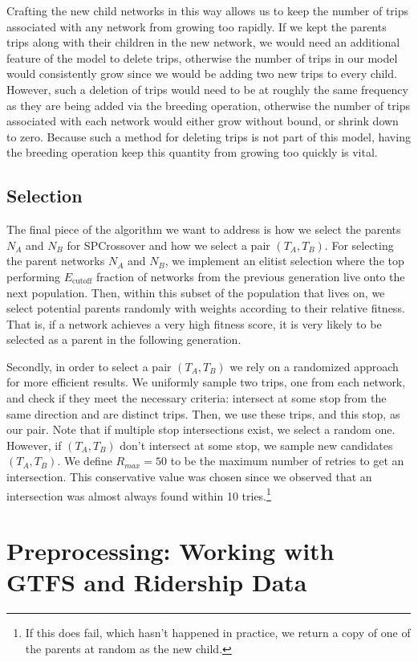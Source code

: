 \documentclass[11pt]{amsart}
\theoremstyle{definition}                  %
\theoremstyle{remark}                       %
\numberwithin{equation}{section}
\begin{document}
Crafting the new child networks in this way allows us to keep the number of trips associated with any network from growing too rapidly. If we kept the parents trips along with their children in the new network, we would need an additional feature of the model to delete trips, otherwise the number of trips in our model would consistently grow since we would be adding two new trips to every child. However, such a deletion of trips would need to be at roughly the same frequency as they are being added via the breeding operation, otherwise the number of trips associated with each network would either grow without bound, or shrink down to zero. Because such a method for deleting trips is not part of this model, having the breeding operation keep this quantity from growing too quickly is vital. 

\subsection{Selection}
The final piece of the algorithm we want to address is how we select the parents $N_A$ and $N_B$ for SPCrossover and how we select a pair $(T_A, T_B)$. For selecting the parent networks $N_A$ and $N_B$, we implement an elitist selection where the top performing $E_{\text{cutoff}}$ fraction of networks from the previous generation live onto the next population. Then, within this subset of the population that lives on, we select potential parents randomly with weights according to their relative fitness. That is, if a network achieves a very high fitness score, it is very likely to be selected as a parent in the following generation. 

Secondly, in order to select a pair $(T_A, T_B)$ we rely on a randomized approach for more efficient results. We uniformly sample two trips, one from each network, and check if they meet the necessary criteria: intersect at some stop from the same direction and are distinct trips. Then, we use these trips, and this stop, as our pair. Note that if multiple stop intersections exist, we select a random one. However, if $(T_A, T_B)$ don't intersect at some stop, we sample new candidates $(T_A, T_B)$. We define $R_{max}=50$ to be the maximum number of retries to get an intersection. This conservative value was chosen since we observed that an intersection was almost always found within 10 tries.\footnote{If this does fail, which hasn't happened in practice, we return a copy of one of the parents at random as the new child. }

\section{Preprocessing: Working with GTFS and Ridership Data}
\end{document}
